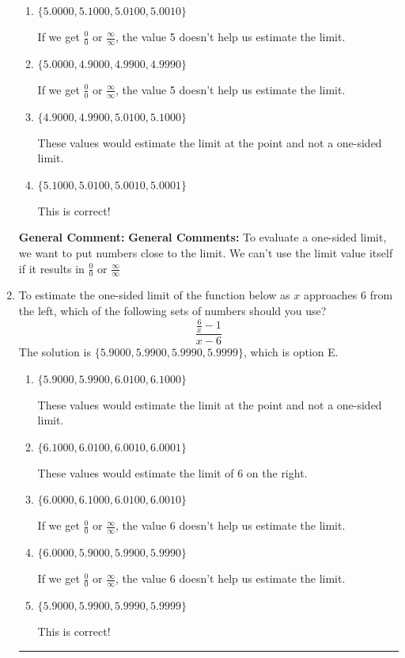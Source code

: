 \documentclass{extbook}[14pt]
\newcommand{\litem}[1]{\item #1

\rule{\textwidth}{0.4pt}}
\begin{document}
\begin{enumerate}
{\begin{enumerate}[label=\Alph*.]
These values would estimate the limit of 5 on the left.
\item \( \{ 5.0000, 5.1000, 5.0100, 5.0010 \} \)

If we get $\frac{0}{0}$ or $\frac{\infty}{\infty}$, the value 5 doesn't help us estimate the limit.
\item \( \{ 5.0000, 4.9000, 4.9900, 4.9990 \} \)

If we get $\frac{0}{0}$ or $\frac{\infty}{\infty}$, the value 5 doesn't help us estimate the limit.
\item \( \{ 4.9000, 4.9900, 5.0100, 5.1000 \} \)

These values would estimate the limit at the point and not a one-sided limit.
\item \( \{ 5.1000, 5.0100, 5.0010, 5.0001 \} \)

This is correct!
\end{enumerate}

\textbf{General Comment:} \textbf{General Comments:} To evaluate a one-sided limit, we want to put numbers close to the limit. We can't use the limit value itself if it results in $\frac{0}{0}$ or $\frac{\infty}{\infty}$
}
\litem{
To estimate the one-sided limit of the function below as $x$ approaches 6 from the left, which of the following sets of numbers should you use?
\[ \frac{\frac{6}{x} - 1}{x - 6} \]The solution is \( \{ 5.9000, 5.9900, 5.9990, 5.9999 \} \), which is option E.\begin{enumerate}[label=\Alph*.]
\item \( \{ 5.9000, 5.9900, 6.0100, 6.1000 \} \)

These values would estimate the limit at the point and not a one-sided limit.
\item \( \{ 6.1000, 6.0100, 6.0010, 6.0001 \} \)

These values would estimate the limit of 6 on the right.
\item \( \{ 6.0000, 6.1000, 6.0100, 6.0010 \} \)

If we get $\frac{0}{0}$ or $\frac{\infty}{\infty}$, the value 6 doesn't help us estimate the limit.
\item \( \{ 6.0000, 5.9000, 5.9900, 5.9990 \} \)

If we get $\frac{0}{0}$ or $\frac{\infty}{\infty}$, the value 6 doesn't help us estimate the limit.
\item \( \{ 5.9000, 5.9900, 5.9990, 5.9999 \} \)

This is correct!
\end{enumerate}

}
\end{enumerate}
\end{document}
